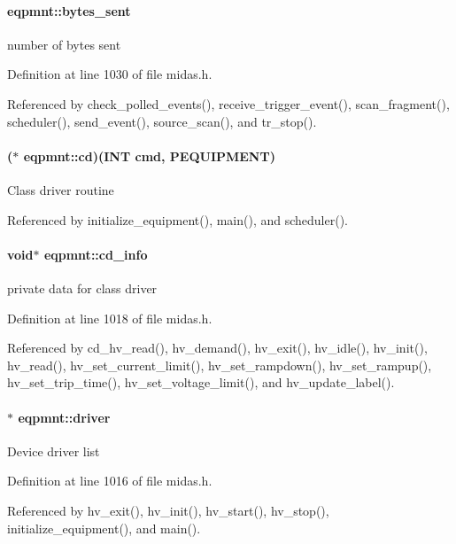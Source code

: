 \paragraph[{bytes\_\-sent}]{ {\bf eqpmnt::bytes\_\-sent}}\hfill\label{structeqpmnt_a2d00b43d76412e41d7f10c1cb786eade}
number of bytes sent 

Definition at line 1030 of file midas.h.

Referenced by check\_\-polled\_\-events(), receive\_\-trigger\_\-event(), scan\_\-fragment(), scheduler(), send\_\-event(), source\_\-scan(), and tr\_\-stop().
\paragraph[{cd}]{($\ast$ {\bf eqpmnt::cd})({\bf INT} cmd, {\bf PEQUIPMENT})}\hfill\label{structeqpmnt_ae263c2d6a07b0aeb17b85ee3ea042220}
Class driver routine 

Referenced by initialize\_\-equipment(), main(), and scheduler().
\paragraph[{cd\_\-info}]{\setlength{\rightskip}{0pt plus 5cm}void$\ast$ {\bf eqpmnt::cd\_\-info}}\hfill\label{structeqpmnt_ac88537c1672f32d13a99ce6822fc4d46}
private data for class driver 

Definition at line 1018 of file midas.h.

Referenced by cd\_\-hv\_\-read(), hv\_\-demand(), hv\_\-exit(), hv\_\-idle(), hv\_\-init(), hv\_\-read(), hv\_\-set\_\-current\_\-limit(), hv\_\-set\_\-rampdown(), hv\_\-set\_\-rampup(), hv\_\-set\_\-trip\_\-time(), hv\_\-set\_\-voltage\_\-limit(), and hv\_\-update\_\-label().
\paragraph[{driver}]{$\ast$ {\bf eqpmnt::driver}}\hfill\label{structeqpmnt_af19c464fc7092048c9418328ca4e4afc}
Device driver list 

Definition at line 1016 of file midas.h.

Referenced by hv\_\-exit(), hv\_\-init(), hv\_\-start(), hv\_\-stop(), initialize\_\-equipment(), and main().
